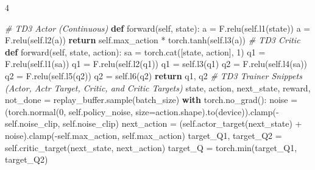 \documentclass{article}
\makeatletter
\newenvironment{Shaded}{\CodeFontSize\setlength{\topsep}{\CodeBlockSkip}\setlength{\partopsep}{0pt}}{}
\newcommand{\BuiltInTok}[1]{\textcolor[rgb]{0.00,0.50,0.00}{#1}}
\newcommand{\CommentTok}[1]{\textcolor[rgb]{0.38,0.63,0.69}{\textit{#1}}}
\newcommand{\ControlFlowTok}[1]{\textcolor[rgb]{0.00,0.44,0.13}{\textbf{#1}}}
\newcommand{\DecValTok}[1]{\textcolor[rgb]{0.25,0.63,0.44}{#1}}
\newcommand{\KeywordTok}[1]{\textcolor[rgb]{0.00,0.44,0.13}{\textbf{#1}}}
\newcommand{\NormalTok}[1]{#1}
\newcommand{\OperatorTok}[1]{\textcolor[rgb]{0.40,0.40,0.40}{#1}}
\newcommand{\VariableTok}[1]{\textcolor[rgb]{0.10,0.09,0.49}{#1}}
\newcommand{\CodeFontSize}{\fontsize{3.6}{4}\selectfont}
\newlength{\CodeBlockSkip}
\newcommand{\NumCodeColumns}{4}  %
\newcommand{\SectionFontStyle}{\fontsize{6.4}{7.2}\selectfont\bfseries}
\newlength{\SectionBeforeSkip}
\newlength{\SectionAfterSkip}
\renewcommand\section{\@startsection{section}{1}{\z@}{\SectionBeforeSkip}{\SectionAfterSkip}{\normalfont\SectionFontStyle}}
\makeatother
\begin{document}
\begin{multicols*}{\NumCodeColumns}
\section{Assignment 3}\label{assignment-3}

\begin{Shaded}
\begin{Highlighting}[]
\CommentTok{\# TD3 Actor (Continuous)}
\KeywordTok{def}\NormalTok{ forward(}\VariableTok{self}\NormalTok{, state):}
\NormalTok{  a }\OperatorTok{=}\NormalTok{ F.relu(}\VariableTok{self}\NormalTok{.l1(state))}
\NormalTok{  a }\OperatorTok{=}\NormalTok{ F.relu(}\VariableTok{self}\NormalTok{.l2(a))}
  \ControlFlowTok{return} \VariableTok{self}\NormalTok{.max\_action }\OperatorTok{*}\NormalTok{ torch.tanh(}\VariableTok{self}\NormalTok{.l3(a))}
\CommentTok{\# TD3 Critic}
\KeywordTok{def}\NormalTok{ forward(}\VariableTok{self}\NormalTok{, state, action):}
\NormalTok{    sa }\OperatorTok{=}\NormalTok{ torch.cat([state, action], }\DecValTok{1}\NormalTok{)}
\NormalTok{    q1 }\OperatorTok{=}\NormalTok{ F.relu(}\VariableTok{self}\NormalTok{.l1(sa))}
\NormalTok{    q1 }\OperatorTok{=}\NormalTok{ F.relu(}\VariableTok{self}\NormalTok{.l2(q1))}
\NormalTok{    q1 }\OperatorTok{=} \VariableTok{self}\NormalTok{.l3(q1)}
\NormalTok{    q2 }\OperatorTok{=}\NormalTok{ F.relu(}\VariableTok{self}\NormalTok{.l4(sa))}
\NormalTok{    q2 }\OperatorTok{=}\NormalTok{ F.relu(}\VariableTok{self}\NormalTok{.l5(q2))}
\NormalTok{    q2 }\OperatorTok{=} \VariableTok{self}\NormalTok{.l6(q2)}
    \ControlFlowTok{return}\NormalTok{ q1, q2}
\CommentTok{\# TD3 Trainer Snippets (Actor, Actr Target, Critic, and Critic Targets)}
\NormalTok{state, action, next\_state, reward, not\_done }\OperatorTok{=}\NormalTok{ replay\_buffer.sample(batch\_size)}
\ControlFlowTok{with}\NormalTok{ torch.no\_grad():}
\NormalTok{  noise }\OperatorTok{=}\NormalTok{ (torch.normal(}\DecValTok{0}\NormalTok{, }\VariableTok{self}\NormalTok{.policy\_noise, size}\OperatorTok{=}\NormalTok{action.shape).to(device)).clamp(}\OperatorTok{{-}}\VariableTok{self}\NormalTok{.noise\_clip, }\VariableTok{self}\NormalTok{.noise\_clip)}
\NormalTok{  next\_action }\OperatorTok{=}\NormalTok{ (}\VariableTok{self}\NormalTok{.actor\_target(next\_state) }\OperatorTok{+}\NormalTok{ noise).clamp(}\OperatorTok{{-}}\VariableTok{self}\NormalTok{.max\_action, }\VariableTok{self}\NormalTok{.max\_action)}
\NormalTok{  target\_Q1, target\_Q2 }\OperatorTok{=} \VariableTok{self}\NormalTok{.critic\_target(next\_state, next\_action)}
\NormalTok{  target\_Q }\OperatorTok{=}\NormalTok{ torch.}\BuiltInTok{min}\NormalTok{(target\_Q1, target\_Q2)}

\end{Highlighting}
\end{Shaded}
\end{multicols*}
\end{document}
